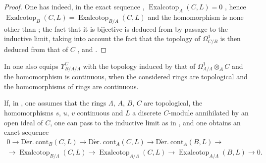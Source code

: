 \begin{proof}
One has indeed, in the exact sequence , $\operatorname{Exalcotop}_A(C,L)=0$ , hence $\operatorname{Exalcotop}_B(C,L)=\operatorname{Exalcotop}_{B/A}(C,L)$ and the homomorphism  is none other than ; the fact that it is bijective is deduced from  by passage to the inductive limit, taking into account the fact that the topology of $\Omega^1_{C/B}$ is then deduced from that of $C$ , and .
\end{proof}

\begin{env}[20.7.12]
\label{0.20.7.12}
In  one also equips $\Upsilon^C_{B/A/\Lambda}$ with the topology induced by that of $\Omega^1_{A/\Lambda}\otimes_A C$ and the homomorphism  is continuous, when the considered rings are topological and the homomorphisms of rings are continuous.
\end{env}

\begin{env}[20.7.13]
\label{0.20.7.13}
If, in , one assumes that the rings $\Lambda$, $A$, $B$, $C$ are topological, the homomorphisms $s$, $u$, $v$ continuous and $L$ a discrete $C$-module annihilated by an open ideal of $C$, one can pass to the inductive limit as in , and one obtains an exact sequence
\begin{equation}
\tag{20.7.13.1}
  \label{0.20.7.13.1}
\begin{split}
  0\to\operatorname{D\acute{e}r.\ cont}_B(C,L)\to\operatorname{D\acute{e}r.\ cont}_A(C,L)\to\operatorname{D\acute{e}r.\ cont}_A(B,L)\to \\
  \to\operatorname{Exalcotop}_{B/\Lambda}(C,L)\to\operatorname{Exalcotop}_{A/\Lambda}(C,L)\to\operatorname{Exalcotop}_{A/\Lambda}(B,L)\to 0.
\end{split}
\end{equation}
\end{env}

